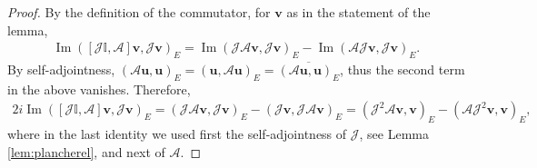 \documentclass[report]{elsarticle}
\numberwithin{theorem}{section}
\renewcommand{\Im}{\operatorname{Im}}
\renewcommand{\vec}[1]{\mathbf{#1}}
\begin{document}
\begin{proof}
By the definition of the commutator, for $\vec{v}$ as in the statement of the lemma, 
	\begin{align*}
		\Im ([\mathcal{J}\mathbb{I}, \mathcal{A}]\vec{v},\mathcal{J} \vec{v})_{E}=\Im (\mathcal{J}\mathcal{A}\vec{v}, \mathcal{J}\vec{v})_{E}-\Im (\mathcal{A}\mathcal{J}\vec{v}, \mathcal{J}\vec{v})_{E}.
	\end{align*}
	By self-adjointness, $(\mathcal{A}\vec{u}, \vec{u})_E=(\vec{u}, \mathcal{A}\vec{u})_E=\overline{(\mathcal{A}\vec{u}, \vec{u})_E}$, thus the second term in the above vanishes. Therefore, 
	\begin{align*}
		2i\Im ([\mathcal{J}\mathbb{I}, \mathcal{A}]\vec{v},\mathcal{J} \vec{v})_E=(\mathcal{J}\mathcal{A}\vec{v}, \mathcal{J}\vec{v})_E-(\mathcal{J}\vec{v}, \mathcal{J}\mathcal{A}\vec{v})_E=(\mathcal{J}^2\mathcal{A}\vec{v}, \vec{v})_E-(\mathcal{A}\mathcal{J}^2\vec{v}, \vec{v})_E,
	\end{align*}
	where in the last identity we used first the self-adjointness of $\mathcal{J}$, see Lemma \ref{lem:plancherel}, and next of $\mathcal{A}$.
\end{proof}
\end{document}
